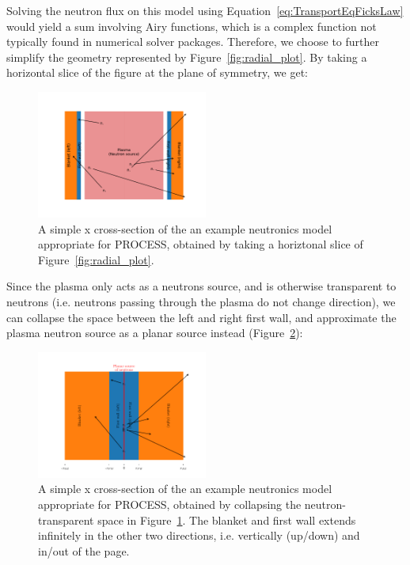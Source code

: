 \documentclass[a4paper, 12pt]{article}
\begin{document}
Solving the neutron flux on this model using Equation~\ref{eq:TransportEqFicksLaw} would yield a sum involving Airy functions, which is a complex function not typically found in numerical solver packages.
Therefore, we choose to further simplify the geometry represented by Figure~\ref{fig:radial_plot}. By taking a horizontal slice of the figure at the plane of symmetry, we get:

\begin{figure}[H]
\centering
\includegraphics[width=0.5\textwidth]{semiinfinite_plot.pdf} %
\caption{A simple x cross-section of the an example neutronics model appropriate for PROCESS, obtained by taking a horiztonal slice of Figure~\ref{fig:radial_plot}.} \label{fig:semiinfinite_plot}
\end{figure}

Since the plasma only acts as a neutrons source, and is otherwise transparent to neutrons (i.e. neutrons passing through the plasma do not change direction), we can collapse the space between the left and right first wall, and approximate the plasma neutron source as a planar source instead (Figure~\ref{fig:collapsed_geometry}):

\begin{figure}[H]
\centering
\includegraphics[width=0.5\textwidth]{collapsed_geometry.pdf} %
\caption{A simple x cross-section of the an example neutronics model appropriate for PROCESS, obtained by collapsing the neutron-transparent space in Figure~\ref{fig:semiinfinite_plot}. The blanket and first wall extends infinitely in the other two directions, i.e. vertically (up/down) and in/out of the page.} \label{fig:collapsed_geometry}
\end{figure}
\end{document}
